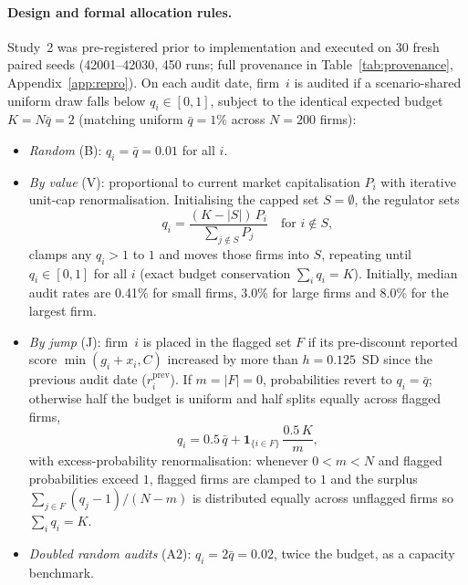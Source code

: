 \documentclass[11pt]{article}
\begin{document}
\paragraph{Design and formal allocation rules.} Study~2 was pre-registered prior to implementation and executed on 30 fresh paired seeds (42001--42030, 450 runs; full provenance in Table~\ref{tab:provenance}, Appendix~\ref{app:repro}). On each audit date, firm~$i$ is audited if a scenario-shared uniform draw falls below $q_i \in [0,1]$, subject to the identical expected budget $K = N\bar q = 2$ (matching uniform $\bar q = 1\%$ across $N = 200$ firms):
\begin{itemize}[leftmargin=*]
\item \emph{Random} (B): $q_i = \bar q = 0.01$ for all $i$.
\item \emph{By value} (V): proportional to current market capitalisation $P_i$ with iterative unit-cap renormalisation. Initialising the capped set $S = \emptyset$, the regulator sets
\begin{equation}
q_i = \frac{(K - |S|)\,P_i}{\sum_{j \notin S} P_j} \quad \text{for } i \notin S,
\label{eq:audit_v}
\end{equation}
clamps any $q_i > 1$ to $1$ and moves those firms into $S$, repeating until $q_i \in [0,1]$ for all $i$ (exact budget conservation $\sum_i q_i = K$). Initially, median audit rates are 0.41\% for small firms, 3.0\% for large firms and 8.0\% for the largest firm.
\item \emph{By jump} (J): firm~$i$ is placed in the flagged set $F$ if its pre-discount reported score $\min(g_i + x_i, C)$ increased by more than $h = 0.125$~SD since the previous audit date ($r_i^{\mathrm{prev}}$). If $m = |F| = 0$, probabilities revert to $q_i = \bar q$; otherwise half the budget is uniform and half splits equally across flagged firms,
\begin{equation}
q_i = 0.5\,\bar q + \mathbf{1}_{\{i \in F\}}\,\frac{0.5\,K}{m},
\label{eq:audit_j}
\end{equation}
with excess-probability renormalisation: whenever $0 < m < N$ and flagged probabilities exceed $1$, flagged firms are clamped to $1$ and the surplus $\sum_{j \in F}(q_j - 1)/(N - m)$ is distributed equally across unflagged firms so $\sum_i q_i = K$.
\item \emph{Doubled random audits} (A2): $q_i = 2\bar q = 0.02$, twice the budget, as a capacity benchmark.
\end{itemize}
\end{document}
